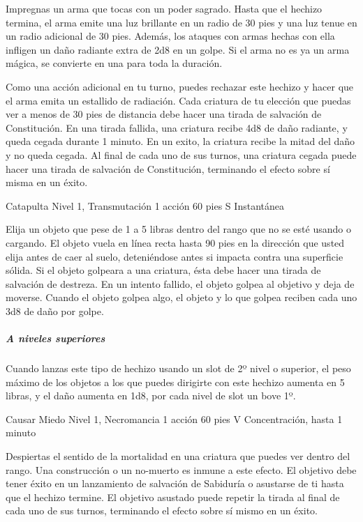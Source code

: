 \documentclass[a4paper,twocolumn,openany,10pt]{dndbook}
\begin{document}
	Impregnas un arma que tocas con un poder sagrado. Hasta que el hechizo termina, el arma emite una luz brillante en un radio
	de 30 pies y una luz tenue en un radio adicional de 30 pies. Además, los ataques con armas hechas con ella infligen un daño
	radiante extra de 2d8 en un golpe. Si el arma no es ya un arma mágica, se convierte en una para toda la duración.
	
	Como una acción adicional en tu turno, puedes rechazar este hechizo y hacer que el arma emita un estallido de radiación.
	Cada criatura de tu elección que puedas ver a menos de 30 pies de distancia debe hacer una tirada de salvación de
	Constitución. En una tirada fallida, una criatura recibe 4d8 de daño radiante, y queda cegada durante 1 minuto. En un exito,
	la criatura recibe la mitad del daño y no queda cegada. Al final de cada uno de sus turnos, una criatura cegada puede hacer
	una tirada de salvación de Constitución, terminando el efecto sobre sí misma en un éxito. 

\spellheader%
	{Catapulta}
	{Nivel 1, Transmutación}
	{1 acción}
	{60 pies}
	{S}
	{Instantánea}
	
	Elija un objeto que pese de 1 a 5 libras dentro del rango que no se esté usando o cargando. El objeto vuela en línea recta
	hasta 90 pies en la dirección que usted elija antes de caer al suelo, deteniéndose antes si impacta contra una superficie
	sólida. Si el objeto golpeara a una criatura, ésta debe hacer una tirada de salvación de destreza. En un intento fallido, el
	objeto golpea al objetivo y deja de moverse. Cuando el objeto golpea algo, el objeto y lo que golpea reciben cada uno 3d8 de
	daño por golpe.

	\subparagraph{A niveles superiores} Cuando lanzas este tipo de hechizo usando un slot de 2º nivel o superior, el peso máximo
	de los objetos a los que puedes dirigirte con este hechizo aumenta en 5 libras, y el daño aumenta en 1d8, por cada nivel de
	slot un bove 1º.

\spellheader%
	{Causar Miedo}
	{Nivel 1, Necromancia}
	{1 acción}
	{60 pies}
	{V}
	{Concentración, hasta 1 minuto}

	Despiertas el sentido de la mortalidad en una criatura que puedes ver dentro del rango. Una construcción o un no-muerto es
	inmune a este efecto. El objetivo debe tener éxito en un lanzamiento de salvación de Sabiduría o asustarse de ti hasta que
	el hechizo termine. El objetivo asustado puede repetir la tirada al final de cada uno de sus turnos, terminando el efecto
	sobre sí mismo en un éxito.
	
\end{document}
